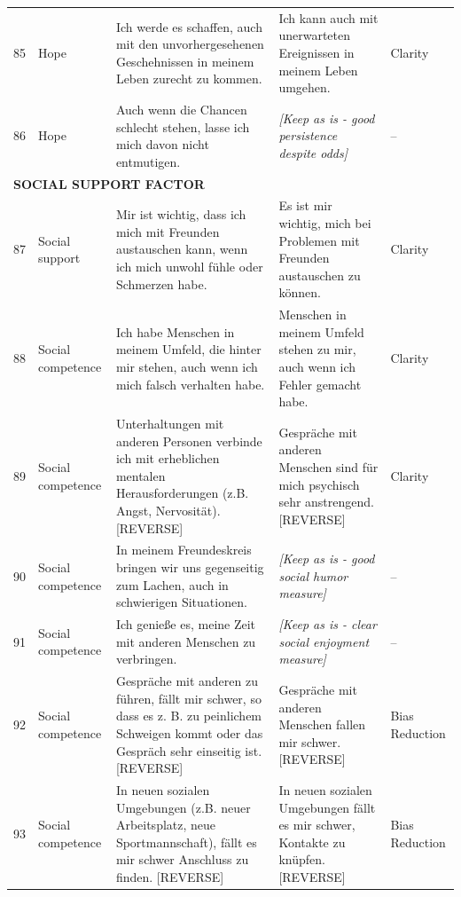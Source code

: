 \documentclass[12pt,a4paper]{article}
\begin{document}
\begin{longtable}{p{}p{}p{}p{}p{}}
85 & Hope & Ich werde es schaffen, auch mit den unvorhergesehenen Geschehnissen in meinem Leben zurecht zu kommen. & Ich kann auch mit unerwarteten Ereignissen in meinem Leben umgehen. & Clarity \\

86 & Hope & Auch wenn die Chancen schlecht stehen, lasse ich mich davon nicht entmutigen. & \textit{[Keep as is - good persistence despite odds]} & -- \\

\midrule
\multicolumn{5}{l}{\textbf{SOCIAL SUPPORT FACTOR}} \\
\midrule

87 & Social support & Mir ist wichtig, dass ich mich mit Freunden austauschen kann, wenn ich mich unwohl fühle oder Schmerzen habe. & Es ist mir wichtig, mich bei Problemen mit Freunden austauschen zu können. & Clarity \\

88 & Social competence & Ich habe Menschen in meinem Umfeld, die hinter mir stehen, auch wenn ich mich falsch verhalten habe. & Menschen in meinem Umfeld stehen zu mir, auch wenn ich Fehler gemacht habe. & Clarity \\

89 & Social competence & Unterhaltungen mit anderen Personen verbinde ich mit erheblichen mentalen Herausforderungen (z.B. Angst, Nervosität). [REVERSE] & Gespräche mit anderen Menschen sind für mich psychisch sehr anstrengend. [REVERSE] & Clarity \\

90 & Social competence & In meinem Freundeskreis bringen wir uns gegenseitig zum Lachen, auch in schwierigen Situationen. & \textit{[Keep as is - good social humor measure]} & -- \\

91 & Social competence & Ich genieße es, meine Zeit mit anderen Menschen zu verbringen. & \textit{[Keep as is - clear social enjoyment measure]} & -- \\

92 & Social competence & Gespräche mit anderen zu führen, fällt mir schwer, so dass es z. B. zu peinlichem Schweigen kommt oder das Gespräch sehr einseitig ist. [REVERSE] & Gespräche mit anderen Menschen fallen mir schwer. [REVERSE] & Bias Reduction \\

93 & Social competence & In neuen sozialen Umgebungen (z.B. neuer Arbeitsplatz, neue Sportmannschaft), fällt es mir schwer Anschluss zu finden. [REVERSE] & In neuen sozialen Umgebungen fällt es mir schwer, Kontakte zu knüpfen. [REVERSE] & Bias Reduction \\


\end{longtable}
\end{document}
